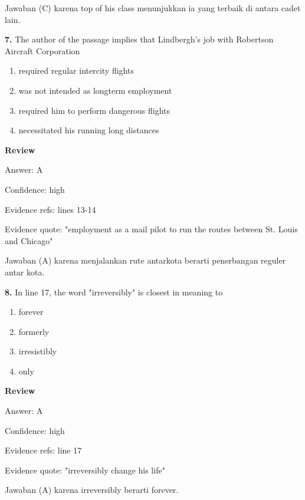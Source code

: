 \documentclass[12pt]{article}
\begin{document}
Jawaban (C) karena top of his class menunjukkan ia yang terbaik di antara cadet lain.\par
\endgroup
\par
\vspace{0.25\baselineskip}
\noindent\textbf{7.} The author of the passage implies that Lindbergh's job with Robertson Aircraft Corporation
\begin{enumerate}[label=(\Alph*),leftmargin=*,itemsep=0.2em]
\item required regular intercity flights
\item was not intended as longterm employment
\item required him to perform dangerous flights
\item necessitated his running long distances
\end{enumerate}
\par
\begingroup
\setlength{\parskip}{0pt}
\setlength{\parindent}{0pt}
\textbf{Review}\par
Answer: A\par
Confidence: high\par
Evidence refs: lines 13-14\par
Evidence quote: "employment as a mail pilot to run the routes between St. Louis and Chicago"\par
Jawaban (A) karena menjalankan rute antarkota berarti penerbangan reguler antar kota.\par
\endgroup
\par
\vspace{0.25\baselineskip}
\noindent\textbf{8.} In line 17, the word "irreversibly" is closest in meaning to
\begin{enumerate}[label=(\Alph*),leftmargin=*,itemsep=0.2em]
\item forever
\item formerly
\item irresistibly
\item only
\end{enumerate}
\par
\begingroup
\setlength{\parskip}{0pt}
\setlength{\parindent}{0pt}
\textbf{Review}\par
Answer: A\par
Confidence: high\par
Evidence refs: line 17\par
Evidence quote: "irreversibly change his life"\par
Jawaban (A) karena irreversibly berarti forever.\par
\end{document}
